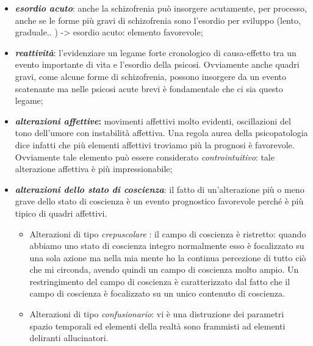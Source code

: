 \begin{itemize}
\item
  \textbf{\emph{esordio acuto}}: anche la schizofrenia può insorgere
  acutamente, per processo, anche se le forme più gravi di schizofrenia
  sono l'esordio per sviluppo (lento, graduale.. ) -\textgreater{}
  esordio acuto: elemento favorevole;
\item
  \textbf{\emph{reattività}}: l'evidenziare un legame forte cronologico
  di causa-effetto tra un evento importante di vita e l'esordio della
  psicosi. Ovviamente anche quadri gravi, come alcune forme di
  schizofrenia, possono insorgere da un evento scatenante ma nelle
  psicosi acute brevi è fondamentale che ci sia questo legame;
\item
  \textbf{\emph{alterazioni affettive}:} movimenti affettivi molto
  evidenti, oscillazioni del tono dell'umore con instabilità affettiva.
  Una regola aurea della psicopatologia dice infatti che più elementi
  affettivi troviamo più la prognosi è favorevole. Ovviamente tale
  elemento può essere considerato \emph{controintuitivo}: tale
  alterazione affettiva è più impressionabile;
\item
  \textbf{\emph{alterazioni dello stato di coscienza}}: il fatto di
  un'alterazione più o meno grave dello stato di coscienza è un evento
  prognostico favorevole perché è più tipico di quadri affettivi.

\begin{itemize}
\item
  Alterazioni di tipo \emph{\emph{crepuscolare}} : il campo di coscienza
  è ristretto: quando abbiamo uno stato di coscienza integro normalmente
  esso è focalizzato su una sola azione ma nella mia mente ho la
  continua percezione di tutto ciò che mi circonda, avendo quindi un
  campo di coscienza molto ampio. Un restringimento del campo di
  coscienza è caratterizzato dal fatto che il campo di coscienza è
  focalizzato su un unico contenuto di coscienza.
\item
  Alterazioni di tipo \emph{\emph{confusionario}}: vi è una distruzione
  dei parametri spazio temporali ed elementi della realtà sono frammisti
  ad elementi deliranti allucinatori.
\end{itemize}


\end{itemize}
